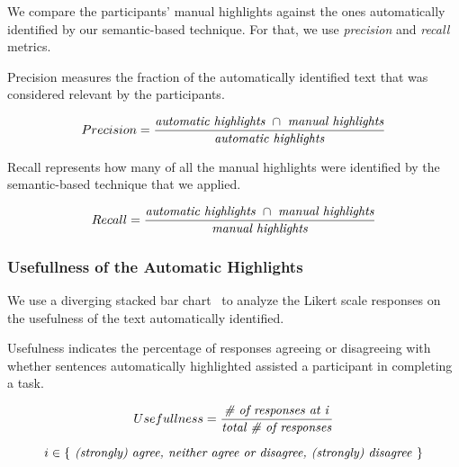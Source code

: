 We compare the participants' manual highlights  against the ones automatically identified by our semantic-based technique. 
For that, we use \textit{precision} and \textit{recall} metrics. 




Precision measures the fraction of the automatically identified text that was  considered relevant
by the participants.

\smallskip
\begin{small}


\begin{equation}
    Precision = \frac{
        \text{\textit{automatic highlights}~} \cap 
        \text{~\textit{manual highlights}}
    }{\text{\textit{automatic highlights}}}
\end{equation}
\end{small}


Recall represents how many of all the manual highlights were identified by the semantic-based technique that we applied.

\smallskip
\begin{small}

\begin{equation}
    Recall = \frac{
        \text{\textit{automatic highlights}~} \cap 
        \text{~\textit{manual highlights}}
    }{\text{\textit{manual highlights}}}
\end{equation}
\end{small}

\medskip
{}





\subsubsection{Usefullness of the Automatic Highlights}


We use a diverging stacked bar chart~\cite{Heiberger2014} to analyze the  Likert scale
responses on the usefulness of the text automatically identified.


Usefulness indicates the percentage of responses agreeing or disagreeing with whether sentences
automatically highlighted assisted a participant in completing a task.


\smallskip
\begin{small}

\begin{equation}
Usefullness = \frac{
    \text{\textit{\# of responses at i}}
}{
    \text{\textit{total \# of responses}}
}
\end{equation}
        

\begin{equation*}
i \in \{ 
    \text{\textit{
        (strongly) agree, neither agree or disagree, (strongly) disagree
    }}  
\}
\end{equation*}
\end{small}

